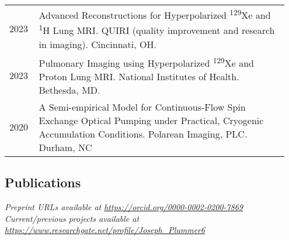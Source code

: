 \documentclass[12pt,]{scrartcl}
\begin{document}
\begin{table}[!h]
{\def\arraystretch{1.5}\tabcolsep=0pt
\begin{tabular}{p{0.10\linewidth}p{0.85\linewidth}}
  
  2023 & Advanced Reconstructions for Hyperpolarized \textsuperscript{129}Xe and \textsuperscript{1}H Lung MRI. QUIRI (quality improvement and research in imaging). Cincinnati, OH. \\

  2023 & Pulmonary Imaging using Hyperpolarized \textsuperscript{129}Xe and Proton Lung MRI. National Institutes of Health. Bethesda, MD. \\

  2020 & A Semi-empirical Model for Continuous-Flow Spin Exchange Optical Pumping under Practical, Cryogenic Accumulation Conditions. Polarean Imaging, PLC. Durham, NC \\

    
  
\end{tabular}%
}
\end{table}

\subsection{Publications}\label{publications}

\emph{Preprint URLs available at
\url{https://orcid.org/0000-0002-0200-7869}}\\
\emph{Current/previous projects available at \url{https://www.researchgate.net/profile/Joseph_Plummer6}}
\end{document}
